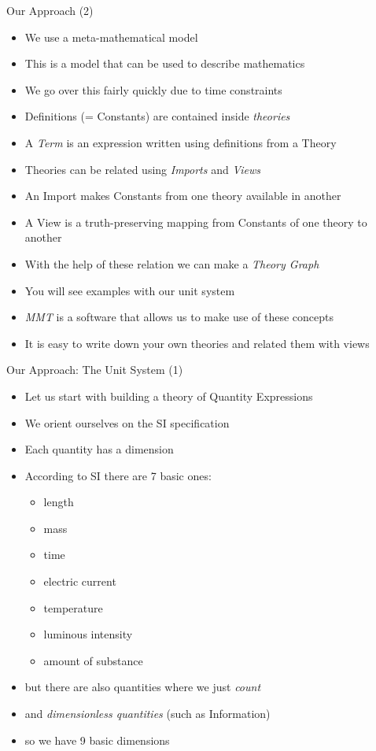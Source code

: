 \documentclass{beamer}
\begin{document}
  \begin{frame}{Our Approach (2)}
    \begin{itemize}[<+->]
      \item We use a meta-mathematical model
      \item This is a model that can be used to describe mathematics
      \item We go over this fairly quickly due to time constraints
      \item Definitions (= Constants) are contained inside \textit{theories}
      \item A \textit{Term} is an expression written using definitions from a Theory
      \item Theories can be related using \textit{Imports} and \textit{Views}
      \item An Import makes Constants from one theory available in another
      \item A View is a truth-preserving mapping from Constants of one theory to another
      \item With the help of these relation we can make a \textit{Theory Graph}
      \item You will see examples with our unit system
      \item \textit{MMT} is a software that allows us to make use of these concepts
      \item It is easy to write down your own theories and related them with views
    \end{itemize}
  \end{frame}
  \begin{frame}{Our Approach: The Unit System (1)}
    \begin{itemize}[<+->]

      \item Let us start with building a theory of Quantity Expressions
      \item We orient ourselves on the SI specification
      \item Each quantity has a dimension
      \item According to SI there are 7 basic ones:
      \begin{itemize}
        \item length
        \item mass
        \item time
        \item electric current
        \item temperature
        \item luminous intensity
        \item amount of substance
      \end{itemize}
      \item but there are also quantities where we just \textit{count}
      \item and \textit{dimensionless quantities} (such as Information)
      \item so we have 9 basic dimensions
    \end{itemize}
  \end{frame}
\end{document}
